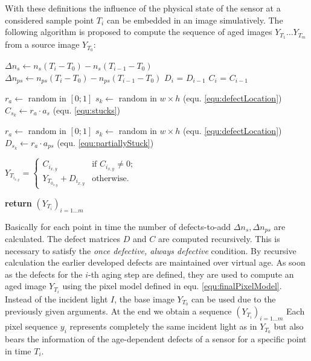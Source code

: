 \documentclass[10pt,twocolumn,letterpaper]{article}
\begin{document}
With these definitions the influence of the physical state of the sensor at a considered sample point $T_i$ can be embedded in an image simulatively. The following algorithm is proposed to compute the sequence of aged images $Y_{T_1} \dots Y_{T_m}$ from a source image $Y_{T_0}$:

\vspace{5mm}
\begin{algorithmic}[1]


\State $\Delta n_s\gets n_s(T_i - T_0) - n_s(T_{i-1} - T_0) $ 
\State $\Delta n_{ps}\gets n_{ps}(T_i - T_0) - n_{ps}(T_{i-1} - T_0) $
\State $D_i$ = $D_{i-1}$
\State $C_i$ = $C_{i-1}$

    \State $r_a \gets$ random in $[0;1]$
    \State $s_k \gets$ random in $w \times h$ (equ. \ref{equ:defectLocation})
    \State $C_{s_k} \gets r_a \cdot a_s$ (equ. \ref{equ:stucks})
  \EndFor
  
    \State $r_a \gets$ random in $[0;1]$ 
    \State $s_k \gets$ random in $w \times h$ (equ. \ref{equ:defectLocation})
    \State $D_{s_k} \gets r_a \cdot a_{ps}$ (equ. \ref{equ:partiallyStuck})
  \EndFor
  
  
  $Y_{T_{i_{x,y}}} = \begin{cases}
  C_{i_{x,y}}  & \text{if $C_{i_{x,y}} \neq 0$}; \\
  Y_{T_{0_{x,y}}} +D_{i_{x,y}}  & \text{otherwise}.
  \end{cases}$
  
\EndFor
\State \textbf{return} $(Y_{T_i})_{i=1 \dots m}$
\EndProcedure
\end{algorithmic}

\vspace{5mm}


Basically for each point in time the number of defects-to-add $\Delta n_s, \Delta n_{ps}$ are calculated. The defect matrices $D$ and $C$ are computed recursively. This is necessary to satisfy the \emph{once defective, always defective} condition. By recursive calculation the earlier developed defects are maintained over virtual age. As soon as the defects for the $i$-th aging step are defined, they are used to compute an aged image $Y_{T_i}$ using the pixel model defined in equ. \ref{equ:finalPixelModel}. Instead of the incident light $I$, the base image $Y_{T_0}$ can be used due to the previously given arguments. At the end we obtain a sequence  $(Y_{T_i})_{i=1 \dots m}$ Each pixel sequence $y_i$ represents completely the same incident light as in $Y_{T_0}$ but also bears the information of the age-dependent defects of a sensor for a specific point in time $T_i$.
 
\end{document}
